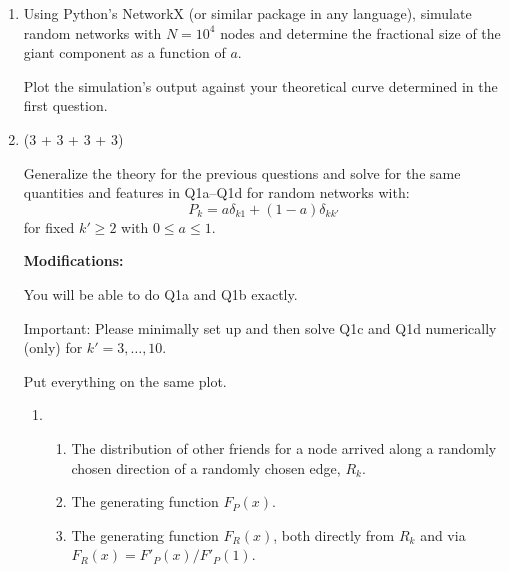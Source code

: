 \begin{enumerate}
     \item
       Using Python's NetworkX (or similar package in any language), simulate random networks
       with $N=10^{4}$ nodes and determine the fractional 
       size of the giant component as a function of $a$.
       
       Plot the simulation's output against your theoretical
       curve determined in the first question.
       
       
   \solutionstart


   \solutionend


     \item (3 + 3 + 3 + 3)

       Generalize the theory for the previous questions and solve for the same
       quantities and features in Q1a--Q1d for random networks with:
       $$
       P_{k} 
       = 
       a 
       \delta_{k1} 
       + 
       (1-a) 
       \delta_{kk'}
       $$
       for fixed $k' \ge 2$ with $0 \le a \le 1$.

       \textbf{Modifications:}

       You will be able to do Q1a and Q1b exactly.

       Important: Please minimally set up and then
       solve Q1c and Q1d numerically (only)
       for $k' = 3, \ldots, 10$.

       Put everything on the same plot.
       
       \begin{enumerate}
       \item 
         \begin{enumerate}
         \item 
           The distribution of other friends for a node
           arrived along a randomly chosen direction
           of a randomly chosen edge,
           $R_{k}$.

           
   \solutionstart


   \solutionend

         \item 
           The generating function $F_{P}(x)$.

           
   \solutionstart


   \solutionend

         \item 
           The generating function $F_{R}(x)$, both
           directly from $R_{k}$ and via 
           $F_{R}(x) = F'_{P}(x)/F'_{P}(1)$.


\end{enumerate}
\end{enumerate}
\end{enumerate}
